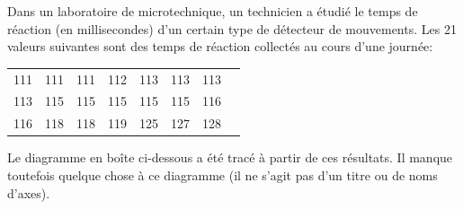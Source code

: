 \begin{questions}
\newpage
\question[]\label{micro}
Dans un laboratoire de microtechnique, un technicien a étudié le temps de réaction (en millisecondes) d'un certain type de détecteur de mouvements. Les 21 valeurs suivantes sont des temps de réaction collectés au cours d'une journée:

\begin{center}
\begin{tabular}{  c c c c c c c c }
111  &111  &111  &112  &113  &113  &113 \\
113 &115  &115  &115  &115 &115 & 116 \\
116 & 118 & 118 & 119 & 125 &127 & 128\\
\end{tabular}
\end{center}

Le diagramme en boîte ci-dessous a été tracé à partir de ces résultats. Il manque toutefois quelque chose à ce diagramme (il ne s'agit pas d'un titre ou de noms d'axes).

\medskip

\begin{parts}

\end{parts}
\end{questions}

